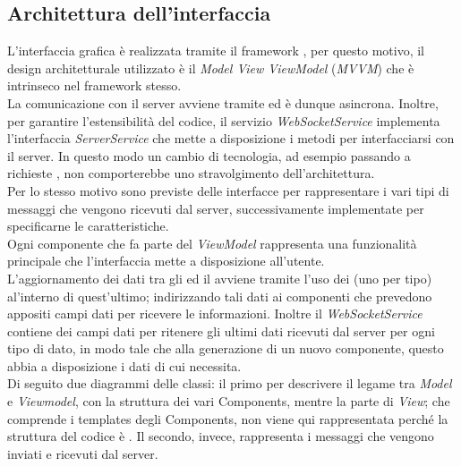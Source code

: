 \subsection{Architettura dell'interfaccia}
	L'interfaccia grafica è realizzata tramite il framework , per questo motivo, il design architetturale utilizzato è il \textit{Model View ViewModel} (\textit{MVVM}) che è intrinseco nel framework stesso. \\
	\newline
	La comunicazione con il server avviene tramite  ed è dunque asincrona.
	Inoltre, per garantire l'estensibilità del codice, il servizio \textit{WebSocketService} implementa l'interfaccia \textit{ServerService} che mette a disposizione i metodi per interfacciarsi con il server. In questo modo un cambio di tecnologia, ad esempio passando a richieste , non comporterebbe uno stravolgimento dell'architettura. \\
	Per lo stesso motivo sono previste delle interfacce per rappresentare i vari tipi di messaggi che vengono ricevuti dal server, successivamente implementate per specificarne le caratteristiche. \\
	Ogni componente che fa parte del \textit{ViewModel} rappresenta una funzionalità principale che l'interfaccia mette a disposizione all'utente.\\
	\newline
	L'aggiornamento dei dati tra gli  ed il  avviene tramite l'uso dei  (uno per tipo) al'interno di quest'ultimo; indirizzando tali dati  ai componenti che prevedono appositi campi dati per ricevere le informazioni.
	Inoltre il \textit{WebSocketService} contiene dei campi dati per ritenere gli ultimi dati ricevuti dal server per ogni tipo di dato, in modo tale che alla generazione di un nuovo componente,  questo abbia a disposizione i dati di cui necessita. \\
	\newline
	Di seguito due diagrammi delle classi: il primo per descrivere il legame tra \textit{Model} e \textit{Viewmodel}, con la struttura dei vari  Components, mentre la parte di \textit{View}; che comprende i templates degli  Components, non viene qui rappresentata perché la struttura del codice è .
	Il secondo, invece, rappresenta i messaggi che vengono inviati e ricevuti dal server.
	\newpage

